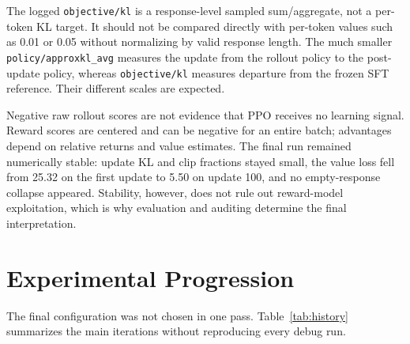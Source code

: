\documentclass[11pt]{article}
\begin{document}
The logged \texttt{objective/kl} is a response-level sampled sum/aggregate,
not a per-token KL target. It should not be compared directly with
per-token values such as 0.01 or 0.05 without normalizing by valid response
length. The much smaller \texttt{policy/approxkl\_avg} measures the update from
the rollout policy to the post-update policy, whereas
\texttt{objective/kl} measures departure from the frozen SFT reference. Their
different scales are expected.

Negative raw rollout scores are not evidence that PPO receives no learning
signal. Reward scores are centered and can be negative for an entire batch;
advantages depend on relative returns and value estimates. The final run
remained numerically stable: update KL and clip fractions stayed small, the
value loss fell from 25.32 on the first update to 5.50 on update 100, and no
empty-response collapse appeared. Stability, however, does not rule out
reward-model exploitation, which is why evaluation and auditing determine the
final interpretation.

\section{Experimental Progression}

The final configuration was not chosen in one pass. Table~\ref{tab:history}
summarizes the main iterations without reproducing every debug run.
\end{document}

